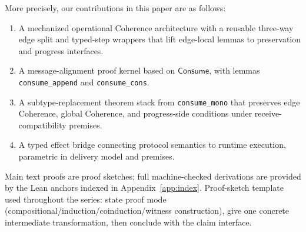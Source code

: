 \documentclass[a4paper,10pt,twocolumn,english]{article}
\numberwithin{equation}{section}
\theoremstyle{paperdef}
\theoremstyle{paperplain}
\theoremstyle{paperdef}
\theoremstyle{paperremark}
\newcommand{\Consume}{\ensuremath{\mathsf{Consume}}}
\begin{document}
More precisely, our contributions in this paper are as follows:
\begin{enumerate}
	\item A mechanized operational Coherence architecture with a reusable three-way edge split and typed-step wrappers that lift edge-local lemmas to preservation and progress interfaces.
	\item A message-alignment proof kernel based on \Consume, with lemmas \nolinkurl{consume_append} and \nolinkurl{consume_cons}.
	\item A subtype-replacement theorem stack from \nolinkurl{consume_mono} that preserves edge Coherence, global Coherence, and progress-side conditions under receive-compatibility premises.
	\item A typed effect bridge connecting protocol semantics to runtime execution, parametric in delivery model and premises.
\end{enumerate}

Main text proofs are proof sketches; full machine-checked derivations are provided by the Lean anchors indexed in Appendix~\ref{app:index}.
Proof-sketch template used throughout the series: state proof mode
(compositional/induction/coinduction/witness construction), give one concrete
intermediate transformation, then conclude with the claim interface.
\end{document}
